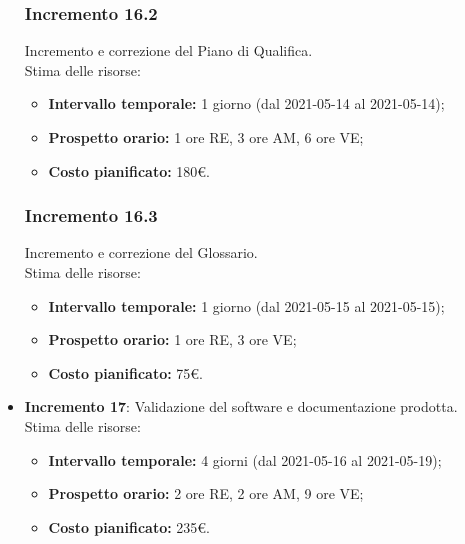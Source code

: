 \begin{itemize}
\subsubsection{Incremento 16.2}
Incremento e correzione del Piano di Qualifica.\\
Stima delle risorse:
\begin{itemize}
	\item \textbf{Intervallo temporale:} 1 giorno (dal 2021-05-14 al 2021-05-14);
	\item \textbf{Prospetto orario:} 1 ore RE, 3 ore AM, 6 ore VE;
	\item \textbf{Costo pianificato:} 180€.
\end{itemize}
\subsubsection{Incremento 16.3}
Incremento e correzione del Glossario.\\
Stima delle risorse:
\begin{itemize}
	\item \textbf{Intervallo temporale:} 1 giorno (dal 2021-05-15 al 2021-05-15);
	\item \textbf{Prospetto orario:} 1 ore RE, 3 ore VE;
	\item \textbf{Costo pianificato:} 75€.
\end{itemize}


\item \textbf{Incremento 17}:
Validazione del software e documentazione prodotta.\\
Stima delle risorse:
\begin{itemize}
	\item \textbf{Intervallo temporale:} 4 giorni (dal 2021-05-16 al 2021-05-19);
	\item \textbf{Prospetto orario:} 2 ore RE, 2 ore AM, 9 ore VE;
	\item \textbf{Costo pianificato:} 235€.
\end{itemize}


\end{itemize}
